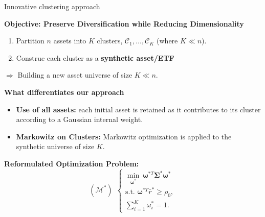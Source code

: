 \documentclass[dvipsnames,mathserif]{beamer}
\newcommand\mypv{\vfill \ifthenelse{\boolean{withPause}}{ \pause }{}}
\begin{document}
\begin{frame}{Innovative clustering approach}

\centering
\textbf{Objective: Preserve Diversification while Reducing Dimensionality}

\vspace{0.2cm}

\begin{enumerate}
    \item Partition \( n \) assets into \( K \) clusters, \( \mathcal{C}_1, \ldots, \mathcal{C}_K \) (where \( K \ll n \)).
    \item Construe each cluster as a \textbf{synthetic asset/ETF}
\end{enumerate} 

$\Longrightarrow$ Building a new asset universe of size \( K \ll n \).

\vspace{0.3cm}

\mypv 

\textbf{What differentiates our approach}
\begin{itemize}
    \item \textbf{Use of all assets:} each initial asset is retained as it contributes to its cluster according to a Gaussian internal weight.
    \item \textbf{Markowitz on Clusters:} Markowitz optimization is applied to the synthetic universe of size \( K \).
\end{itemize}

\vspace{0.2cm}

\textbf{Reformulated Optimization Problem:}
\begin{equation*}
    (\boldsymbol{\mathcal{M}}^*) ~~
    \left\{
        \begin{array}{ll}
            \underset{\boldsymbol{\omega}^*}{\min} ~ \boldsymbol{\omega}^{*T} \boldsymbol{\Sigma}^* \boldsymbol{\omega}^* \\
            \text{s.t. } \boldsymbol{\omega}^{*T} \bar{r}^* \geq \rho_0,\\
            \sum_{i=1}^K \omega_i^* = 1.
        \end{array}
    \right.
\end{equation*}

\end{frame}
\end{document}
